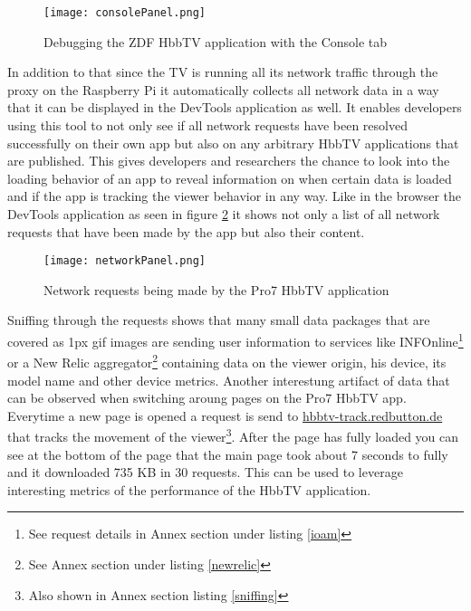 \begin{figure}[htb]
  \centering
  \hspace*{-0.7cm}
  \texttt{[image: consolePanel.png]}\\
  \caption{Debugging the ZDF HbbTV application with the Console tab}\label{fig:consolePanel}
\end{figure}

In addition to that since the TV is running all its network traffic through the proxy on the Raspberry Pi
it automatically collects all network data in a way that it can be displayed in the DevTools application as well.
It enables developers using this tool to not only see if all network requests have been resolved successfully
on their own app but also on any arbitrary HbbTV applications that are published. This gives developers and
researchers the chance to look into the loading behavior of an app to reveal information on when certain data
is loaded and if the app is tracking the viewer behavior in any way. Like in the browser the DevTools application
as seen in figure \ref{fig:networkPanel} it shows not only a list of all network requests that have been made by the
app but also their content.

\begin{figure}[htb]
  \centering
  \hspace*{-0.7cm}
  \texttt{[image: networkPanel.png]}\\
  \caption{Network requests being made by the Pro7 HbbTV application}\label{fig:networkPanel}
\end{figure}

Sniffing through the requests shows that many small data packages that are covered as 1px gif images are
sending user information to services like INFOnline\footnote{See request details in Annex section under
listing \ref{ioam}} or a New Relic aggregator\footnote{See Annex section under listing \ref{newrelic}} containing
data on the viewer origin, his device, its model name and other device metrics. Another interestung artifact
of data that can be observed when switching aroung pages on the Pro7 HbbTV app. Everytime a new page is
opened a request is send to \url{hbbtv-track.redbutton.de} that tracks the movement of the viewer\footnote{Also
shown in Annex section listing \ref{sniffing}}. After the page has fully loaded you can see at the bottom of the
page that the main page took about 7 seconds to fully and it downloaded 735 KB in 30 requests. This can be used
to leverage interesting metrics of the performance of the HbbTV application.

